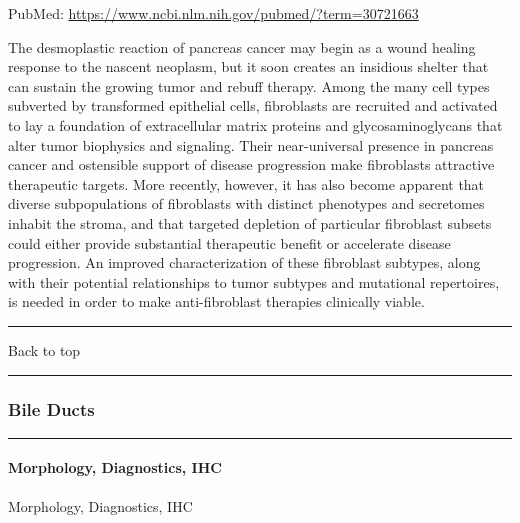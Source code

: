 \documentclass[]{article}
\let\oldparagraph\paragraph
\renewcommand{\paragraph}[1]{\oldparagraph{#1}\mbox{}}
\begin{document}
PubMed: \url{https://www.ncbi.nlm.nih.gov/pubmed/?term=30721663}

The desmoplastic reaction of pancreas cancer may begin as a wound
healing response to the nascent neoplasm, but it soon creates an
insidious shelter that can sustain the growing tumor and rebuff therapy.
Among the many cell types subverted by transformed epithelial cells,
fibroblasts are recruited and activated to lay a foundation of
extracellular matrix proteins and glycosaminoglycans that alter tumor
biophysics and signaling. Their near-universal presence in pancreas
cancer and ostensible support of disease progression make fibroblasts
attractive therapeutic targets. More recently, however, it has also
become apparent that diverse subpopulations of fibroblasts with distinct
phenotypes and secretomes inhabit the stroma, and that targeted
depletion of particular fibroblast subsets could either provide
substantial therapeutic benefit or accelerate disease progression. An
improved characterization of these fibroblast subtypes, along with their
potential relationships to tumor subtypes and mutational repertoires, is
needed in order to make anti-fibroblast therapies clinically viable.

{}

{}

\begin{center}\rule{0.5\linewidth}{\linethickness}\end{center}

Back to top

\begin{center}\rule{0.5\linewidth}{\linethickness}\end{center}

\pagebreak

\hypertarget{bile-ducts}{%
\subsubsection{Bile Ducts}\label{bile-ducts}}

\begin{center}\rule{0.5\linewidth}{\linethickness}\end{center}

\hypertarget{morphology-diagnostics-ihc-1}{%
\paragraph{Morphology, Diagnostics,
IHC}\label{morphology-diagnostics-ihc-1}}

Morphology, Diagnostics, IHC
\end{document}
